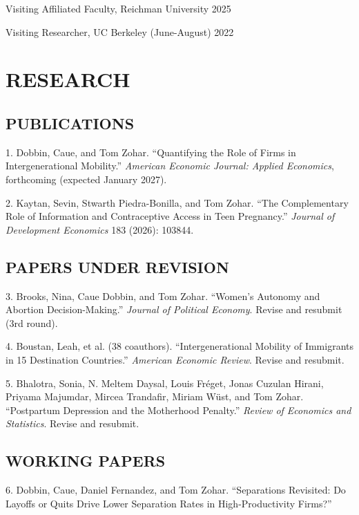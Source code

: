 \documentclass[margin]{res} %
\begin{document}
\begin{resume}
Visiting Affiliated Faculty, Reichman University \hfill 2025

Visiting Researcher, UC Berkeley (June-August) \hfill 2022


\section{RESEARCH}

\subsection{PUBLICATIONS}

1. Dobbin, Caue, and Tom Zohar. ``Quantifying the Role of Firms in Intergenerational Mobility.'' \textit{American Economic Journal: Applied Economics}, forthcoming (expected January 2027).

2. Kaytan, Sevin, Stwarth Piedra-Bonilla, and Tom Zohar. ``The Complementary Role of Information and Contraceptive Access in Teen Pregnancy.'' \textit{Journal of Development Economics} 183 (2026): 103844.

\subsection{PAPERS UNDER REVISION}

3. Brooks, Nina, Caue Dobbin, and Tom Zohar. ``Women's Autonomy and Abortion Decision-Making.'' \textit{Journal of Political Economy}. Revise and resubmit (3rd round).

4. Boustan, Leah, et al. (38 coauthors). ``Intergenerational Mobility of Immigrants in 15 Destination Countries.'' \textit{American Economic Review}. Revise and resubmit.

5. Bhalotra, Sonia, N. Meltem Daysal, Louis Fr\'eget, Jonas Cuzulan Hirani, Priyama Majumdar, Mircea Trandafir, Miriam W\"ust, and Tom Zohar. ``Postpartum Depression and the Motherhood Penalty.'' \textit{Review of Economics and Statistics}. Revise and resubmit.

\subsection{WORKING PAPERS}

6. Dobbin, Caue, Daniel Fernandez, and Tom Zohar. ``Separations Revisited: Do Layoffs or Quits Drive Lower Separation Rates in High-Productivity Firms?''


\end{resume}
\end{document}
